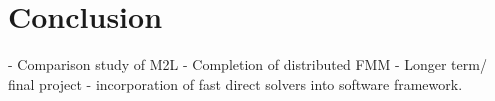 \chapter{Conclusion}\label{chpt:conclusion}



- Comparison study of M2L
- Completion of distributed FMM
- Longer term/ final project - incorporation of fast direct solvers into software framework.
